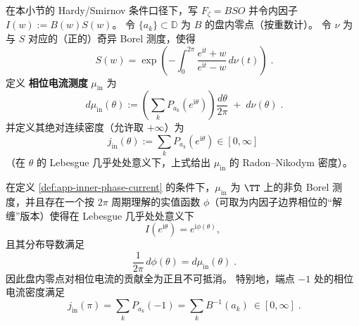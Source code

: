 \begin{definition}[内因子相位电流测度]\label{def:app-inner-phase-current}
在本小节的 Hardy/Smirnov 条件口径下，写 \(F_{\zeta}=BSO\) 并令内因子 \(I(w):=B(w)S(w)\)。
令 \(\{a_k\}\subset\mathbb{D}\) 为 \(B\) 的盘内零点（按重数计）。
令 \(\nu\) 为与 \(S\) 对应的（正的）奇异 Borel 测度，使得
\begin{equation}\label{eq:app-singular-inner-factor-measure}
\boxed{\;
S(w)
=\exp\!\left(
-\int_{0}^{2\pi}\frac{e^{\mathrm{i}t}+w}{e^{\mathrm{i}t}-w}\,d\nu(t)
\right)\; }.
\end{equation}
定义 \textbf{相位电流测度} \(\mu_{\mathrm{in}}\) 为
\begin{equation}\label{eq:app-inner-phase-current-measure}
\boxed{\;
d\mu_{\mathrm{in}}(\theta)
:=
\left(\sum_k P_{a_k}(e^{\mathrm{i}\theta})\right)\frac{d\theta}{2\pi}
\;+\;
d\nu(\theta)\; }.
\end{equation}
并定义其绝对连续密度（允许取 \(+\infty\)）为
\begin{equation}\label{eq:app-inner-phase-current-density}
\boxed{\;
j_{\mathrm{in}}(\theta):=\sum_k P_{a_k}(e^{\mathrm{i}\theta})\in[0,\infty]\;}
\end{equation}
（在 \(\theta\) 的 Lebesgue 几乎处处意义下，上式给出 \(\mu_{\mathrm{in}}\) 的 Radon--Nikodym 密度）。
\end{definition}

\begin{theorem}\label{thm:app-inner-phase-current-poisson}
在定义 \ref{def:app-inner-phase-current} 的条件下，\(\mu_{\mathrm{in}}\) 为 \(\TT\) 上的非负 Borel 测度，并且存在一个按 \(2\pi\) 周期理解的实值函数 \(\phi\)（可取为内因子边界相位的“解缠”版本）使得在 Lebesgue 几乎处处意义下
\[
I(e^{\mathrm{i}\theta})=e^{\mathrm{i}\phi(\theta)},
\]
且其分布导数满足
\begin{equation}\label{eq:app-inner-phase-current-as-arg-derivative}
\boxed{\;
\frac{1}{2\pi}\,d\phi(\theta)=d\mu_{\mathrm{in}}(\theta)\; }.
\end{equation}
因此盘内零点对相位电流的贡献全为正且不可抵消。
特别地，端点 \(-1\) 处的相位电流密度满足
\begin{equation}\label{eq:app-endpoint-phase-current-lowerbound}
\boxed{\;
j_{\mathrm{in}}(\pi)
=\sum_k P_{a_k}(-1)
=\sum_k B^{-1}(a_k)\ \in[0,\infty]\; }.
\end{equation}
\end{theorem}

